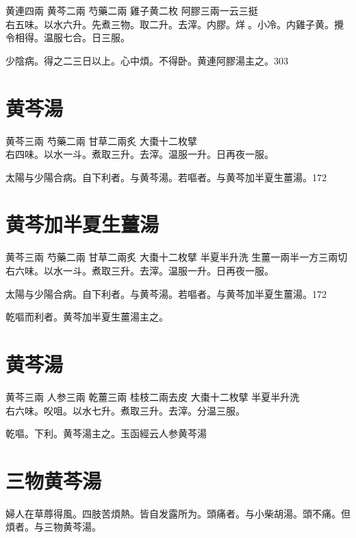 黄連{\scriptsize 四兩} 黄芩{\scriptsize 二兩} 芍藥{\scriptsize 二兩} 雞子黄{\scriptsize 二枚} 阿膠{\scriptsize 三兩一云三挺}\\
右五味。以水六升。先煮三物。取二升。去滓。内膠。烊{\sungtpii 𥁞}。小冷。内雞子黄。攪令相得。温服七合。日三服。

少陰病。得之二三日以上。心中煩。不得卧。黄連阿膠湯主之。303

\section{黄芩湯}

黄芩{\scriptsize 三兩} 芍藥{\scriptsize 二兩} 甘草{\scriptsize 二兩炙} 大棗{\scriptsize 十二枚擘}\\
右四味。以水一斗。煮取三升。去滓。温服一升。日再夜一服。

太陽与少陽合病。自下利者。与黄芩湯。若嘔者。与黄芩加半夏生薑湯。172

\section{黄芩加半夏生薑湯}

黄芩{\scriptsize 三兩} 芍藥{\scriptsize 二兩} 甘草{\scriptsize 二兩炙} 大棗{\scriptsize 十二枚擘} 半夏{\scriptsize 半升洗} 生薑{\scriptsize 一兩半一方三兩切}\\
右六味。以水一斗。煮取三升。去滓。温服一升。日再夜一服。

太陽与少陽合病。自下利者。与黄芩湯。若嘔者。与黄芩加半夏生薑湯。172

乾嘔而利者。黄芩加半夏生薑湯主之。

\section{黄芩湯}

黄芩{\scriptsize 三兩} 人参{\scriptsize 三兩} 乾薑{\scriptsize 三兩} 桂枝{\scriptsize 二兩去皮} 大棗{\scriptsize 十二枚擘} 半夏{\scriptsize 半升洗}\\
右六味。㕮咀。以水七升。煮取三升。去滓。分温三服。

乾嘔。下利。黄芩湯主之。{\scriptsize 玉函經云人参黄芩湯}

\section{三物黄芩湯}

婦人在草蓐得風。四肢苦煩熱。皆自发露所为。頭痛者。与小柴胡湯。頭不痛。但煩者。与三物黄芩湯。

